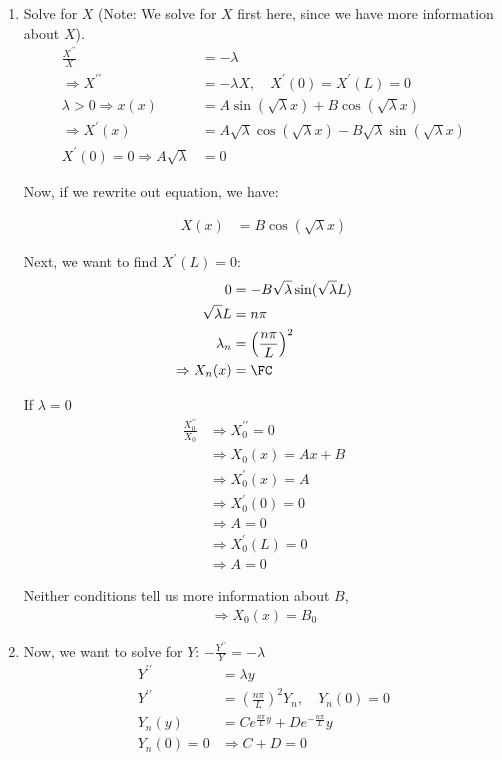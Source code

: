 \begin{enumerate}
  \item Solve for $X$
  (Note: We solve for $X$ first here, since we have more information about $X$).
  \begin{align}
    \frac{X^{\prime\prime}}{X} & = - \lambda\\
    \Rightarrow X^{\prime\prime}
    & = - \lambda X, \quad X^\prime(0) = X^\prime(L) = 0\\
    \lambda > 0 \Rightarrow x(x)
    & = A \sin(\sqrt \lambda x) + B \cos(\sqrt \lambda x)\\
    \Rightarrow X^\prime(x)
    & = A \sqrt \lambda \cos(\sqrt \lambda x)
    - B \sqrt \lambda \sin(\sqrt \lambda x)\\
    X^\prime(0) = 0 \Rightarrow A \sqrt \lambda & = 0
  \end{align}

  Now, if we rewrite out equation, we have:

  \begin{align}
    X(x) & = B \cos(\sqrt \lambda x)
  \end{align}

  Next, we want to find $X^\prime(L) = 0$:
  \begin{align}
    0 & = - B \sqrt \lambda \sin(\sqrt \lambda L)\\
    \sqrt \lambda L & = n \pi\\
    \lambda_n & = \left(\frac{n \pi}{L}\right)^2\\
    \Rightarrow X_n(x) & = \FC
  \end{align}

  If $\lambda = 0$
  \begin{align}
    \frac{X^{\prime\prime}_0}{X_0} & \Rightarrow X^{\prime\prime}_0 = 0\\
    & \Rightarrow X_0(x) = Ax + B\\
    & \Rightarrow X^\prime_0(x) = A\\
    & \Rightarrow X^\prime_0(0) = 0\\
    & \Rightarrow A = 0\\
    & \Rightarrow X^\prime_0(L) = 0\\
    & \Rightarrow A = 0
  \end{align}

  Neither conditions tell us more information about $B$,
  \begin{align}
    \Rightarrow X_0(x) = B_0
  \end{align}

  \item Now, we want to solve for $Y$: $- \frac{Y^{\prime\prime}}{Y} = -\lambda$
  \begin{align}
    Y^{\prime\prime} & = \lambda y\\
    Y^{\prime\prime} & = \left( \frac{n \pi}{L} \right)^2 Y_n, \quad Y_n(0) = 0\\
    Y_n(y) & = Ce^{\frac{n \pi}{L}y} + De^{- \frac{n \pi}{L}}y\\
    Y_n(0) = 0 & \Rightarrow C + D = 0
  \end{align}


\end{enumerate}
